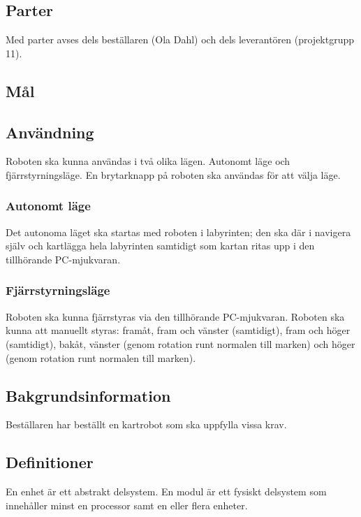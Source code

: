 \documentclass[a4paper,12pt]{article}
\begin{document}
\subsection{Parter}
Med parter avses dels beställaren (Ola Dahl) och dels leverantören
(projektgrupp 11). 

\subsection{Mål}
\begin{LIPSkravlista}
\end{LIPSkravlista}

\subsection{Användning}
Roboten ska kunna användas i två olika lägen. Autonomt läge och
fjärrstyrningsläge. En brytarknapp på roboten ska användas för att välja läge.

\subsubsection{Autonomt läge}
Det autonoma läget ska startas med roboten i labyrinten; den ska där i navigera
själv och kartlägga hela labyrinten samtidigt som kartan ritas upp i den
tillhörande PC-mjukvaran.

\subsubsection{Fjärrstyrningsläge}
Roboten ska kunna fjärrstyras via den tillhörande PC-mjukvaran. Roboten ska
kunna att manuellt styras: framåt, fram och vänster (samtidigt), fram och
höger (samtidigt), bakåt, vänster (genom rotation runt normalen till marken)
och höger (genom rotation runt normalen till marken).
 
\subsection{Bakgrundsinformation}
Beställaren har beställt en kartrobot som ska uppfylla vissa krav.

\subsection{Definitioner}
\label{DEF}
En enhet är ett abstrakt delsystem. En modul är ett fysiskt delsystem som
innehåller minst en processor samt en eller flera enheter.
\end{document}
